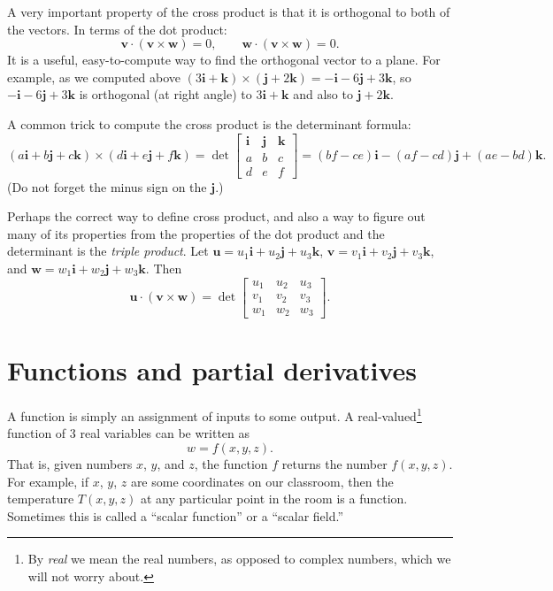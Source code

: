 \documentclass[12pt]{article}
\newcommand{\veci}{\mathbf{i}}
\newcommand{\vecj}{\mathbf{j}}
\newcommand{\veck}{\mathbf{k}}
\begin{document}
A very important property of the cross product is that it is orthogonal
to both of the vectors.
In terms of the dot product:
\[
\mathbf{v} \cdot (\mathbf{v} \times \mathbf{w}) = 0 , \qquad
\mathbf{w} \cdot (\mathbf{v} \times \mathbf{w}) = 0 .
\]
It is a useful, easy-to-compute way to find the orthogonal vector to a plane.
For example, as we computed above
$(3 \veci + \veck) \times (\vecj + 2 \veck)
=
-\veci - 6\vecj + 3 \veck$, so
$-\veci - 6\vecj + 3 \veck$ is orthogonal
(at right angle) to 
$3 \veci + \veck$ and also to
$\vecj + 2 \veck$.

A common trick to compute the cross product
is the determinant formula:
\[
(a \veci + b \vecj + c \veck ) \times 
(d \veci + e \vecj + f \veck ) =
\det
\begin{bmatrix}
\veci & \vecj & \veck \\
a & b & c \\
d & e & f
\end{bmatrix}
=
(bf-ce) \veci -
(af-cd) \vecj +
(ae-bd) \veck .
\]
(Do not forget the minus sign on the $\vecj$.)

Perhaps the correct way to define cross product,
and also a way to figure out many of its properties from
the properties of the dot product and
the determinant is the \emph{triple product}.
Let $\mathbf{u} = u_1 \veci + u_2 \vecj + u_3 \veck$,
$\mathbf{v} = v_1 \veci + v_2 \vecj + v_3 \veck$, and
$\mathbf{w} = w_1 \veci + w_2 \vecj + w_3 \veck$.  Then
\[
\mathbf{u} \cdot ( \mathbf{v} \times \mathbf{w} )
=
\det
\begin{bmatrix}
u_1 & u_2 & u_3 \\
v_1 & v_2 & v_3 \\
w_1 & w_2 & w_3
\end{bmatrix} .
\]


\section{Functions and partial derivatives}

A function is simply an assignment of inputs to some output.
A real-valued\footnote{By \emph{real} we mean the real numbers,
as opposed to complex numbers, which we will not worry about.}
function of 3 real variables can be written as
\[
w = f(x,y,z) .
\]
That is, given numbers $x$, $y$, and $z$, the function $f$ returns the number $f(x,y,z)$.
For example, if $x$, $y$, $z$ are some coordinates on our classroom,
then the temperature $T(x,y,z)$ at any particular point in the room
is a function.  Sometimes this is called a
``scalar function'' or a ``scalar field.''
\end{document}
